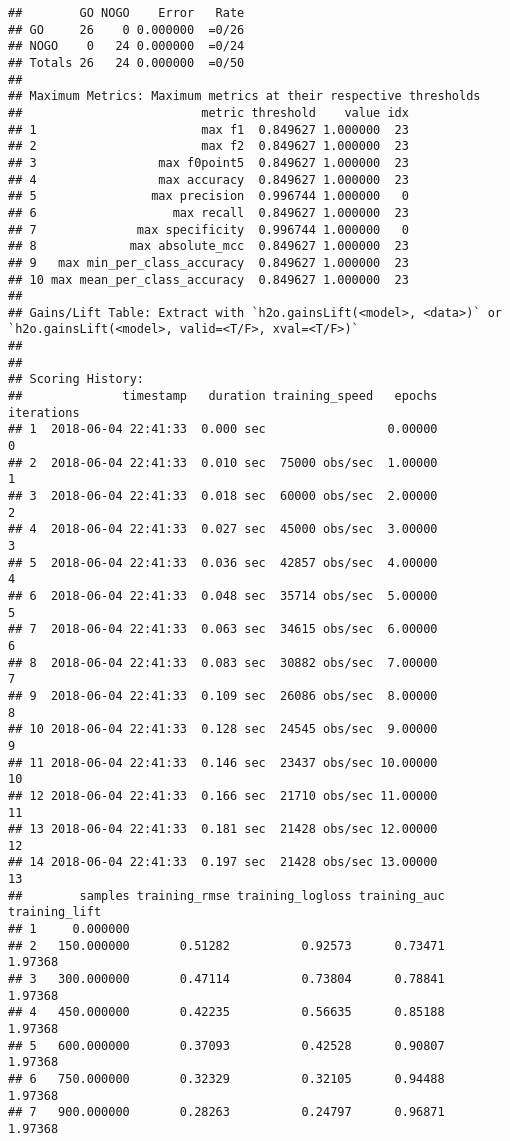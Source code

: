 \documentclass[]{article}
\begin{document}
\begin{verbatim}
##        GO NOGO    Error   Rate
## GO     26    0 0.000000  =0/26
## NOGO    0   24 0.000000  =0/24
## Totals 26   24 0.000000  =0/50
## 
## Maximum Metrics: Maximum metrics at their respective thresholds
##                         metric threshold    value idx
## 1                       max f1  0.849627 1.000000  23
## 2                       max f2  0.849627 1.000000  23
## 3                 max f0point5  0.849627 1.000000  23
## 4                 max accuracy  0.849627 1.000000  23
## 5                max precision  0.996744 1.000000   0
## 6                   max recall  0.849627 1.000000  23
## 7              max specificity  0.996744 1.000000   0
## 8             max absolute_mcc  0.849627 1.000000  23
## 9   max min_per_class_accuracy  0.849627 1.000000  23
## 10 max mean_per_class_accuracy  0.849627 1.000000  23
## 
## Gains/Lift Table: Extract with `h2o.gainsLift(<model>, <data>)` or `h2o.gainsLift(<model>, valid=<T/F>, xval=<T/F>)`
## 
## 
## Scoring History: 
##              timestamp   duration training_speed   epochs iterations
## 1  2018-06-04 22:41:33  0.000 sec                 0.00000          0
## 2  2018-06-04 22:41:33  0.010 sec  75000 obs/sec  1.00000          1
## 3  2018-06-04 22:41:33  0.018 sec  60000 obs/sec  2.00000          2
## 4  2018-06-04 22:41:33  0.027 sec  45000 obs/sec  3.00000          3
## 5  2018-06-04 22:41:33  0.036 sec  42857 obs/sec  4.00000          4
## 6  2018-06-04 22:41:33  0.048 sec  35714 obs/sec  5.00000          5
## 7  2018-06-04 22:41:33  0.063 sec  34615 obs/sec  6.00000          6
## 8  2018-06-04 22:41:33  0.083 sec  30882 obs/sec  7.00000          7
## 9  2018-06-04 22:41:33  0.109 sec  26086 obs/sec  8.00000          8
## 10 2018-06-04 22:41:33  0.128 sec  24545 obs/sec  9.00000          9
## 11 2018-06-04 22:41:33  0.146 sec  23437 obs/sec 10.00000         10
## 12 2018-06-04 22:41:33  0.166 sec  21710 obs/sec 11.00000         11
## 13 2018-06-04 22:41:33  0.181 sec  21428 obs/sec 12.00000         12
## 14 2018-06-04 22:41:33  0.197 sec  21428 obs/sec 13.00000         13
##        samples training_rmse training_logloss training_auc training_lift
## 1     0.000000                                                          
## 2   150.000000       0.51282          0.92573      0.73471       1.97368
## 3   300.000000       0.47114          0.73804      0.78841       1.97368
## 4   450.000000       0.42235          0.56635      0.85188       1.97368
## 5   600.000000       0.37093          0.42528      0.90807       1.97368
## 6   750.000000       0.32329          0.32105      0.94488       1.97368
## 7   900.000000       0.28263          0.24797      0.96871       1.97368

\end{verbatim}
\end{document}
